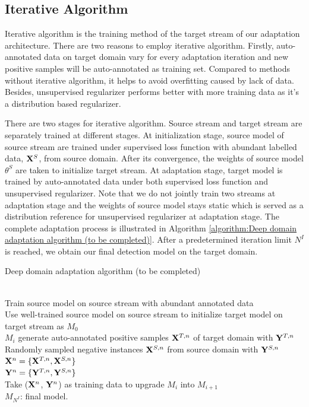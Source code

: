 \documentclass[runningheads]{llncs}
\begin{document}
\subsection{Iterative Algorithm}
\label{Section:Iterative Algorithm}

Iterative algorithm is the training method of the target stream of our adaptation architecture. There are two reasons to employ iterative algorithm. Firstly, auto-annotated data on target domain vary for every adaptation iteration and new positive samples will be auto-annotated as training set. Compared to methods without iterative algorithm, it helps to avoid overfitting caused by lack of data. Besides, unsupervised regularizer performs better with more training data as it's a distribution based regularizer.

There are two stages for iterative algorithm. Source stream and target stream are separately trained at different stages. At initialization stage, source model of source stream are trained under supervised loss function with abundant labelled data, ${\bf X}^{S}$, from source domain. After its convergence, the weights of source model $\theta^{S}$ are taken to initialize target stream. At adaptation stage, target model is trained by auto-annotated data under both supervised loss function and unsupervised regularizer. Note that we do not jointly train two streams at adaptation stage and the weights of source model stays static which is served as a distribution reference for unsupervised regularizer at adaptation stage. The complete adaptation process is illustrated in Algorithm \ref{algorithm:Deep domain adaptation algorithm (to be completed)}. After a predetermined iteration limit $N^{I}$ is reached, we obtain our final detection model on the target domain.

\begin{algorithm}
\caption{Deep domain adaptation algorithm (to be completed)}
\label{algorithm:Deep domain adaptation algorithm (to be completed)}
\begin{algorithmic}[1]
 {} \\
\indent Train source model on source stream with abundant annotated data \\
\indent Use well-trained source model on source stream to initialize target model on target stream as $M_{0}$
 \\
\indent \indent $M_{i}$ generate auto-annotated positive samples ${\bf X}^{T,n}$ of target domain with ${\bf Y}^{T,n}$\\
\indent \indent Randomly sampled negative instances ${\bf X}^{S,n}$ from source domain with ${\bf Y}^{S,n}$\\
\indent \indent ${\bf X}^{n} = \{{\bf X}^{T,n}, {\bf X}^{S,n}\}$ \\
\indent \indent ${\bf Y}^{n} = \{{\bf Y}^{T,n}, {\bf Y}^{S,n}\}$ \\
\indent \indent Take (${\bf X}^{n}$, ${\bf Y}^{n}$) as training data to upgrade $M_{i}$ into $M_{i+1}$
\EndFor \\
\indent $M_{N^{I}}$: final model.
\EndProcedure
\end{algorithmic}
\end{algorithm}
\end{document}

